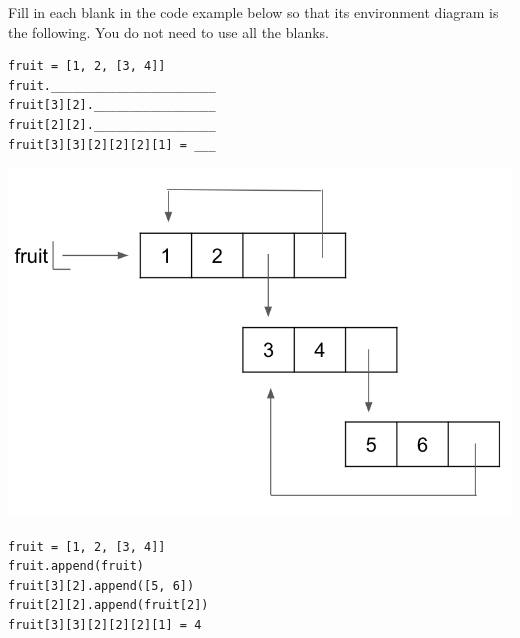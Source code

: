 \begin{blocksection}
\question Fill in each blank in the code example below so that its environment diagram is the following. You do not need to use all the blanks.

\begin{multicols}{2}
\begin{lstlisting}
fruit = [1, 2, [3, 4]]
fruit._______________________
fruit[3][2]._________________
fruit[2][2]._________________
fruit[3][3][2][2][2][1] = ___
\end{lstlisting}

\columnbreak
\includegraphics[width=.45\textwidth]{fruit_loops.png}
\end{multicols}

\begin{solution}[2in]
\begin{lstlisting}
fruit = [1, 2, [3, 4]]
fruit.append(fruit)
fruit[3][2].append([5, 6])
fruit[2][2].append(fruit[2])
fruit[3][3][2][2][2][1] = 4
\end{lstlisting}
\end{solution}
\end{blocksection}

